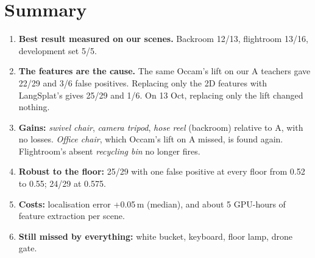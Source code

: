 \documentclass[11pt,a4paper]{article}
\begin{document}
\section{Summary}
\begin{center}\small
{}
\end{center}
\begin{enumerate}[leftmargin=*,itemsep=2pt]
  \item \textbf{Best result measured on our scenes.} Backroom 12/13, flightroom 13/16, development set 5/5.
  \item \textbf{The features are the cause.} The same Occam's lift on our A teachers gave 22/29 and 3/6 false positives.
        Replacing only the 2D features with LangSplat's gives 25/29 and 1/6. On 13 Oct, replacing only the lift changed
        nothing.
  \item \textbf{Gains:} \emph{swivel chair}, \emph{camera tripod}, \emph{hose reel} (backroom) relative to A, with no
        losses. \emph{Office chair}, which Occam's lift on A missed, is found again. Flightroom's absent \emph{recycling bin}
        no longer fires.
  \item \textbf{Robust to the floor:} 25/29 with one false positive at every floor from 0.52 to 0.55; 24/29 at 0.575.
  \item \textbf{Costs:} localisation error +0.05\,m (median), and about 5 GPU-hours of feature extraction per scene.
  \item \textbf{Still missed by everything:} white bucket, keyboard, floor lamp, drone gate.
\end{enumerate}

\end{document}
